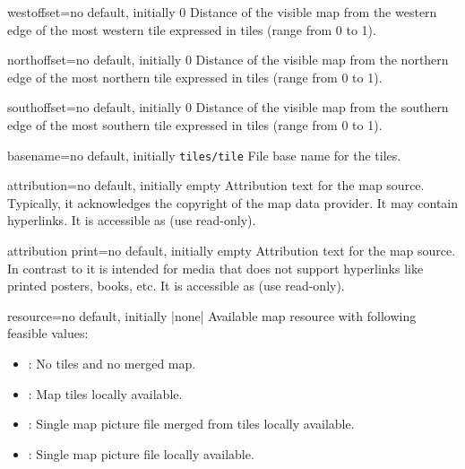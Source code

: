 \begin{docMrcKey}[mapdef]{westoffset}{=}{no default, initially 0}
  Distance of the visible map from the western edge of the most western tile
  expressed in tiles (range from 0 to 1).
\end{docMrcKey}

\begin{docMrcKey}[mapdef]{northoffset}{=}{no default, initially 0}
  Distance of the visible map from the northern edge of the most northern tile
  expressed in tiles (range from 0 to 1).
\end{docMrcKey}

\begin{docMrcKey}[mapdef]{southoffset}{=}{no default, initially 0}
  Distance of the visible map from the southern edge of the most southern tile
  expressed in tiles (range from 0 to 1).
\end{docMrcKey}

\begin{docMrcKey}[mapdef]{basename}{=}{no default, initially \texttt{tiles/tile}}
  File base name for the tiles.
\end{docMrcKey}

\begin{docMrcKey}[mapdef]{attribution}{=}{no default, initially empty}
  Attribution text for the map source. Typically, it acknowledges the copyright
  of the map data provider. It may contain hyperlinks.
  It is accessible as  (use read-only).
\end{docMrcKey}

\begin{docMrcKey}[mapdef]{attribution print}{=}{no default, initially empty}
  Attribution text for the map source.
  In contrast to  it is intended for media
  that does not support hyperlinks like printed posters, books, etc.
  It is accessible as  (use read-only).
\end{docMrcKey}


\begin{docMrcKey}[mapdef]{resource}{=}{no default, initially |none|}
  Available map resource with following feasible values:
  \begin{itemize}
  \item{}: No tiles and no merged map.
  \item{}: Map tiles locally available.
  \item{}: Single map picture file merged from tiles locally available.
  \item{}: Single map picture file locally available.
  \end{itemize}
\end{docMrcKey}

